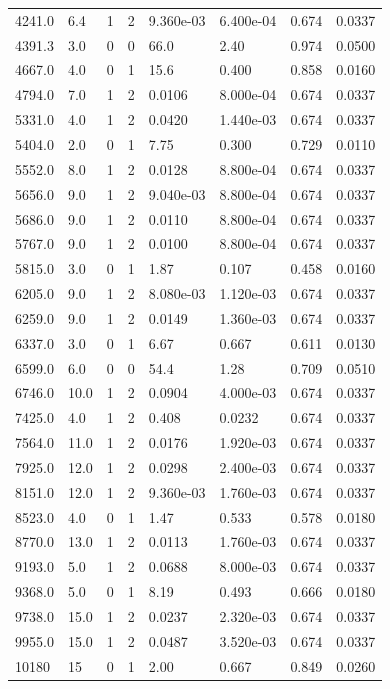 \documentclass[preview]{standalone}
\begin{document}
{{\begin{tabular}{L{1.2cm}C{1.2cm} C{0.3cm}C{0.5cm} C{1.4cm}C{1.4cm} C{1.4cm}C{1.4cm}}
  4241.0  &   6.4  & 1     &  2 &  9.360e-03  & 6.400e-04  & 0.674 &  0.0337   \\ 
  4391.3  &   3.0  & 0     &  0 &  66.0  & 2.40  & 0.974 &  0.0500   \\ 
  4667.0  &   4.0  & 0     &  1 &  15.6  & 0.400  & 0.858 &  0.0160   \\ 
  4794.0  &   7.0  & 1     &  2 &  0.0106  & 8.000e-04  & 0.674 &  0.0337   \\ 
  5331.0  &   4.0  & 1     &  2 &  0.0420  & 1.440e-03  & 0.674 &  0.0337   \\ 
  5404.0  &   2.0  & 0     &  1 &  7.75  & 0.300  & 0.729 &  0.0110   \\ 
  5552.0  &   8.0  & 1     &  2 &  0.0128  & 8.800e-04  & 0.674 &  0.0337   \\ 
  5656.0  &   9.0  & 1     &  2 &  9.040e-03  & 8.800e-04  & 0.674 &  0.0337   \\ 
  5686.0  &   9.0  & 1     &  2 &  0.0110  & 8.800e-04  & 0.674 &  0.0337   \\ 
  5767.0  &   9.0  & 1     &  2 &  0.0100  & 8.800e-04  & 0.674 &  0.0337   \\ 
  5815.0  &   3.0  & 0     &  1 &  1.87  & 0.107  & 0.458 &  0.0160   \\ 
  6205.0  &   9.0  & 1     &  2 &  8.080e-03  & 1.120e-03  & 0.674 &  0.0337   \\ 
  6259.0  &   9.0  & 1     &  2 &  0.0149  & 1.360e-03  & 0.674 &  0.0337   \\ 
  6337.0  &   3.0  & 0     &  1 &  6.67  & 0.667  & 0.611 &  0.0130   \\ 
  6599.0  &   6.0  & 0     &  0 &  54.4  & 1.28  & 0.709 &  0.0510   \\ 
  6746.0  &  10.0  & 1     &  2 &  0.0904  & 4.000e-03  & 0.674 &  0.0337   \\ 
  7425.0  &   4.0  & 1     &  2 &  0.408  & 0.0232  & 0.674 &  0.0337   \\ 
  7564.0  &  11.0  & 1     &  2 &  0.0176  & 1.920e-03  & 0.674 &  0.0337   \\ 
  7925.0  &  12.0  & 1     &  2 &  0.0298  & 2.400e-03  & 0.674 &  0.0337   \\ 
  8151.0  &  12.0  & 1     &  2 &  9.360e-03  & 1.760e-03  & 0.674 &  0.0337   \\ 
  8523.0  &   4.0  & 0     &  1 &  1.47  & 0.533  & 0.578 &  0.0180   \\ 
  8770.0  &  13.0  & 1     &  2 &  0.0113  & 1.760e-03  & 0.674 &  0.0337   \\ 
  9193.0  &   5.0  & 1     &  2 &  0.0688  & 8.000e-03  & 0.674 &  0.0337   \\ 
  9368.0  &   5.0  & 0     &  1 &  8.19  & 0.493  & 0.666 &  0.0180   \\ 
  9738.0  &  15.0  & 1     &  2 &  0.0237  & 2.320e-03  & 0.674 &  0.0337   \\ 
  9955.0  &  15.0  & 1     &  2 &  0.0487  & 3.520e-03  & 0.674 &  0.0337   \\ 
  10180  &    15  & 0     &  1 &  2.00  & 0.667  & 0.849 &  0.0260   \\ 
\hline 
\end{tabular} 

}}
\end{document}
